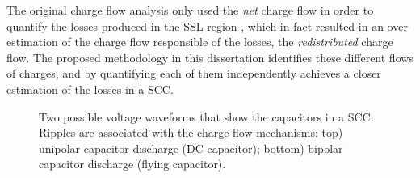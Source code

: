 The original charge flow analysis only used the \emph{net} charge flow in order to quantify the losses produced in the SSL region , which in fact resulted in an over estimation of the charge flow responsible of the losses,  the \emph{redistributed} charge flow. The proposed methodology in this dissertation identifies these different flows of charges, and by quantifying each of them independently achieves a closer estimation of the losses in a SCC.

\begin{figure}[!h]
\centering

\caption[Voltage ripple in the SCC's capacitors]{Two possible voltage waveforms that show the capacitors in a SCC. Ripples are associated with the charge flow mechanisms: top) unipolar capacitor discharge (DC capacitor); bottom) bipolar capacitor discharge (flying capacitor).}
\label{fig:cap_riples}
\end{figure}


